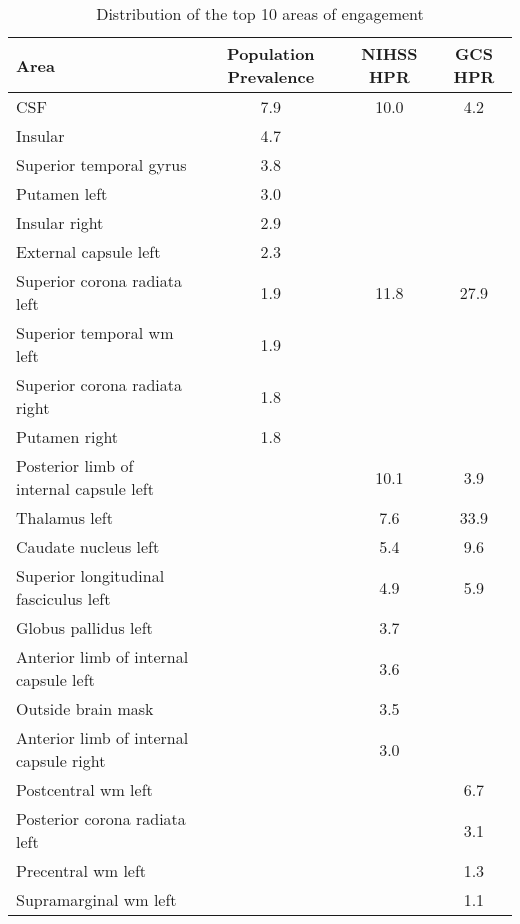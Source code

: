 \begin{table}[ht]
\centering
\begin{tabular}{lccc}
  \hline
Area & Population Prevalence & NIHSS HPR & GCS HPR \\ 
  \hline
CSF & 7.9 & 10.0 & 4.2 \\ 
  Insular & 4.7 &  &  \\ 
  Superior temporal gyrus & 3.8 &  &  \\ 
  Putamen left & 3.0 &  &  \\ 
  Insular right & 2.9 &  &  \\ 
  External capsule left & 2.3 &  &  \\ 
  Superior corona radiata left & 1.9 & 11.8 & 27.9 \\ 
  Superior temporal wm left & 1.9 &  &  \\ 
  Superior corona radiata right & 1.8 &  &  \\ 
  Putamen right & 1.8 &  &  \\ 
  Posterior limb of internal capsule left &  & 10.1 & 3.9 \\ 
  Thalamus left &  & 7.6 & 33.9 \\ 
  Caudate nucleus left &  & 5.4 & 9.6 \\ 
  Superior longitudinal fasciculus left &  & 4.9 & 5.9 \\ 
  Globus pallidus left &  & 3.7 &  \\ 
  Anterior limb of internal capsule left &  & 3.6 &  \\ 
  Outside brain mask &  & 3.5 &  \\ 
  Anterior limb of internal capsule right &  & 3.0 &  \\ 
  Postcentral wm left &  &  & 6.7 \\ 
  Posterior corona radiata left &  &  & 3.1 \\ 
  Precentral wm left &  &  & 1.3 \\ 
  Supramarginal wm left &  &  & 1.1 \\ 
   \hline
\end{tabular}
\caption{Distribution of the top 10 areas of engagement} 
\label{t:breakdown}
\end{table}
